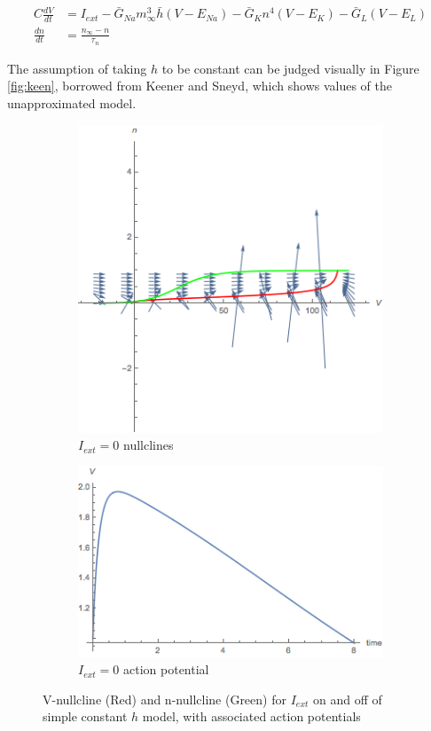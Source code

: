 \documentclass[12]{amsbook}
\newcommand\0{\mathbf{0}}
\newcommand\<{\langle}
\renewcommand\>{\rangle}
\begin{document}
\begin{align*}
        C\frac{dV}{dt} &= I_{ext} -\bar{G}_{Na}m_\infty^3\bar{h}(V-E_{Na}) -\bar{G}_{K}n^4(V-E_{K})  -\bar{G}_{L}(V-E_{L}) \\
    \frac{dn}{dt} &= \frac{n_{\infty}-n}{\tau_n} 
\end{align*}

The assumption of taking $h$ to be constant can be judged visually in Figure \ref{fig:keen}, borrowed from Keener and Sneyd, which shows values of the unapproximated model\cite{keener}.

\begin{figure}
\centering
\begin{subfigure}{\textwidth}
	\centering
	\includegraphics[width=10cm]{fastFast_nullc.png}
	\caption{$I_{ext}=0$ nullclines}
\end{subfigure}
\begin{subfigure}{\textwidth}
	\centering
	\includegraphics[width=10cm]{fastFast.png}
	\caption{$I_{ext}=0$ action potential}
\end{subfigure}
	\caption{V-nullcline (Red) and n-nullcline (Green) for $I_{ext}$ on and off of simple constant $h$ model, with associated action potentials}
	\label{fig:first}
\end{figure}
\end{document}
